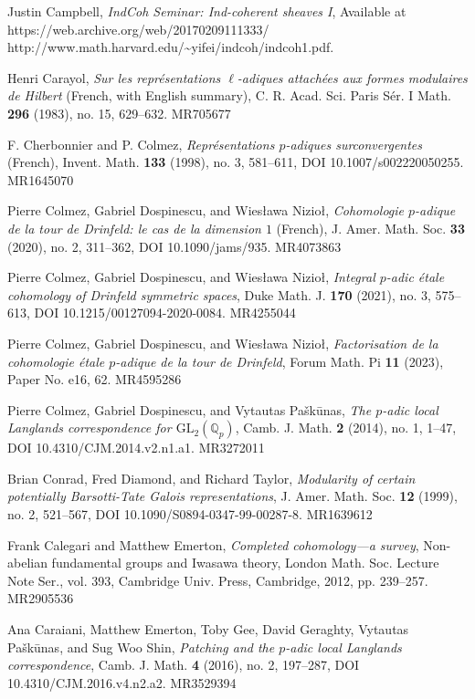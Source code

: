 \item[{[Cam16]}] Justin Campbell, \emph{IndCoh Seminar: Ind-coherent sheaves I}, Available at https://web.archive.org/web/20170209111333/ http://www.math.harvard.edu/\textasciitilde yifei/indcoh/indcoh1.pdf.
\item[{[Car83]}] Henri Carayol, \emph{Sur les repr\'esentations $\ell$-adiques attach\'ees aux formes modulaires de Hilbert} (French, with English summary), C. R. Acad. Sci. Paris S\'er. I Math. \textbf{296} (1983), no. 15, 629--632. MR705677
\item[{[CC98]}] F. Cherbonnier and P. Colmez, \emph{Repr\'esentations $p$-adiques surconvergentes} (French), Invent. Math. \textbf{133} (1998), no. 3, 581--611, DOI 10.1007/s002220050255. MR1645070
\item[{[CDN20]}] Pierre Colmez, Gabriel Dospinescu, and Wies\l{}awa Nizio\l, \emph{Cohomologie $p$-adique de la tour de Drinfeld: le cas de la dimension $1$} (French), J. Amer. Math. Soc. \textbf{33} (2020), no. 2, 311--362, DOI 10.1090/jams/935. MR4073863
\item[{[CDN21]}] Pierre Colmez, Gabriel Dospinescu, and Wies\l{}awa Nizio\l, \emph{Integral $p$-adic \'etale cohomology of Drinfeld symmetric spaces}, Duke Math. J. \textbf{170} (2021), no. 3, 575--613, DOI 10.1215/00127094-2020-0084. MR4255044
\item[{[CDN23]}] Pierre Colmez, Gabriel Dospinescu, and Wies\l{}awa Nizio\l, \emph{Factorisation de la cohomologie \'etale $p$-adique de la tour de Drinfeld}, Forum Math. Pi \textbf{11} (2023), Paper No. e16, 62. MR4595286
\item[{[CDP14]}] Pierre Colmez, Gabriel Dospinescu, and Vytautas Pa\v{s}k\={u}nas, \emph{The $p$-adic local Langlands correspondence for $\mathrm{GL}_2(\mathbb{Q}_p)$}, Camb. J. Math. \textbf{2} (2014), no. 1, 1--47, DOI 10.4310/CJM.2014.v2.n1.a1. MR3272011
\item[{[CDT99]}] Brian Conrad, Fred Diamond, and Richard Taylor, \emph{Modularity of certain potentially Barsotti-Tate Galois representations}, J. Amer. Math. Soc. \textbf{12} (1999), no. 2, 521--567, DOI 10.1090/S0894-0347-99-00287-8. MR1639612
\item[{[CE12]}] Frank Calegari and Matthew Emerton, \emph{Completed cohomology---a survey}, Non-abelian fundamental groups and Iwasawa theory, London Math. Soc. Lecture Note Ser., vol. 393, Cambridge Univ. Press, Cambridge, 2012, pp. 239--257. MR2905536
\item[{[CEG+16]}] Ana Caraiani, Matthew Emerton, Toby Gee, David Geraghty, Vytautas Pa\v{s}k\={u}nas, and Sug Woo Shin, \emph{Patching and the $p$-adic local Langlands correspondence}, Camb. J. Math. \textbf{4} (2016), no. 2, 197--287, DOI 10.4310/CJM.2016.v4.n2.a2. MR3529394
